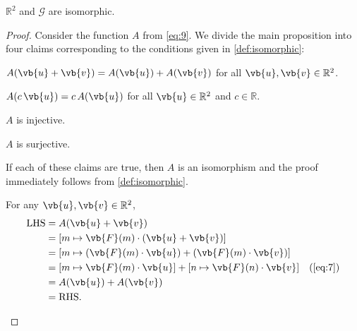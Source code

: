 \begin{enumerate}
\begin{enumerate}
                \medskip

                \begin{proposition} \label{prop:12}
                    $\mathbb{R}^2$ and $\mathscr{G}$ are isomorphic.
                \end{proposition}

                \begin{proof}
                    Consider the function $A$ from \cref{eq:9}.
                    We divide the main proposition into four claims corresponding to the conditions given in \cref{def:isomorphic}:

                    \begin{claim} \label{subprop:12.1}
                        $A(\vb{u} + \vb{v}) = A(\vb{u}) + A(\vb{v})$ for all $\vb{u}, \vb{v} \in \mathbb{R}^2$.
                    \end{claim}

                    \begin{claim} \label{subprop:12.2}
                        $A(c \, \vb{u}) = c \, A(\vb{u})$ for all $\vb{u} \in \mathbb{R}^2$ and $c \in \mathbb{R}$.
                    \end{claim}

                    \begin{claim} \label{subprop:12.3}
                        $A$ is injective.
                    \end{claim}

                    \begin{claim} \label{subprop:12.4}
                        $A$ is surjective.
                    \end{claim}

                    If each of these claims are true, then $A$ is an isomorphism and the proof immediately follows from \cref{def:isomorphic}.

                    \begin{subproof}
                        For any $\vb{u}, \vb{v} \in \mathbb{R}^2$,
                        \begin{align*}
                            && \text{LHS} &= A(\vb{u} + \vb{v}) \\
                            && &= [m \mapsto \vb{F}(m) \cdot (\vb{u} + \vb{v})] \\
                            && &= [m \mapsto (\vb{F}(m) \cdot \vb{u}) + (\vb{F}(m) \cdot \vb{v})] \\
                            && &= [m \mapsto \vb{F}(m) \cdot \vb{u}] + [n \mapsto \vb{F}(n) \cdot \vb{v}] && \text{(\cref{eq:7})} \\
                            && &= A(\vb{u}) + A(\vb{v}) \\
                            && &= \text{RHS}.
                        \end{align*}
                    \end{subproof}


\end{proof}
\end{enumerate}
\end{enumerate}
